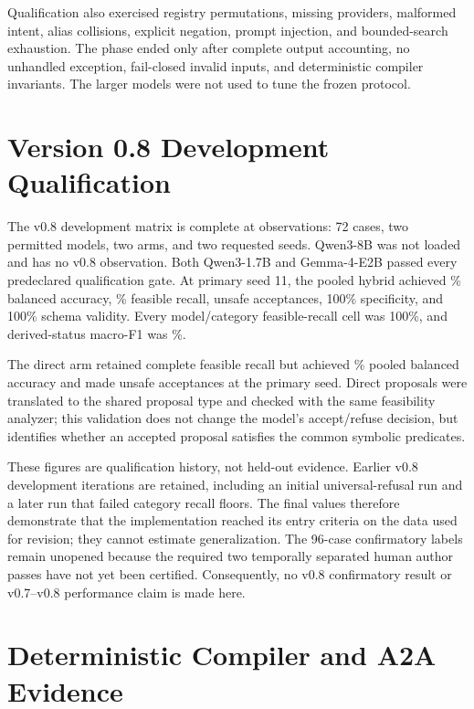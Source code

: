 Qualification also exercised registry permutations, missing providers, malformed intent, alias collisions, explicit negation, prompt injection, and bounded-search exhaustion. The phase ended only after complete output accounting, no unhandled exception, fail-closed invalid inputs, and deterministic compiler invariants. The larger models were not used to tune the frozen protocol.

\section{Version 0.8 Development Qualification}

The v0.8 development matrix is complete at \VEightDevelopmentOutputCount{} observations: 72 cases, two permitted models, two arms, and two requested seeds. Qwen3-8B was not loaded and has no v0.8 observation. Both Qwen3-1.7B and Gemma-4-E2B passed every predeclared qualification gate. At primary seed 11, the pooled hybrid achieved \VEightDevelopmentHybridBalancedAccuracy\% balanced accuracy, \VEightDevelopmentHybridRecall\% feasible recall, \VEightDevelopmentHybridUnsafe{} unsafe acceptances, 100\% specificity, and 100\% schema validity. Every model/category feasible-recall cell was 100\%, and derived-status macro-F1 was \VEightDevelopmentStatusMacroFOne\%.

The direct arm retained complete feasible recall but achieved \VEightDevelopmentDirectBalancedAccuracy\% pooled balanced accuracy and made \VEightDevelopmentDirectUnsafe{} unsafe acceptances at the primary seed. Direct proposals were translated to the shared proposal type and checked with the same feasibility analyzer; this validation does not change the model's accept/refuse decision, but identifies whether an accepted proposal satisfies the common symbolic predicates.

These figures are qualification history, not held-out evidence. Earlier v0.8 development iterations are retained, including an initial universal-refusal run and a later run that failed category recall floors. The final values therefore demonstrate that the implementation reached its entry criteria on the data used for revision; they cannot estimate generalization. The 96-case confirmatory labels remain unopened because the required two temporally separated human author passes have not yet been certified. Consequently, no v0.8 confirmatory result or v0.7--v0.8 performance claim is made here.

\section{Deterministic Compiler and A2A Evidence}

